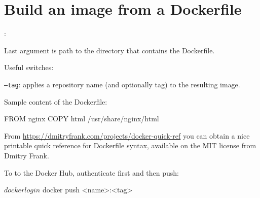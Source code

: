 \section{Build an image from a Dockerfile}
:

Last argument is path to the directory that contains the Dockerfile.

Useful switches:
\begin{compactitem}
    \item \texttt{--tag}: applies a repository name (and optionally tag) to the resulting image.
\end{compactitem}

Sample content of the Dockerfile:
\begin{bashcode}
FROM nginx
COPY html /usr/share/nginx/html
\end{bashcode}

From \url{https://dmitryfrank.com/projects/docker-quick-ref} you can obtain a  nice printable quick reference for Dockerfile syntax, available on the MIT license from Dmitry Frank.

To  to the Docker Hub, authenticate first and then push:
\begin{bashcode}
$ docker login
$ docker push <name>:<tag>
\end{bashcode}

%
